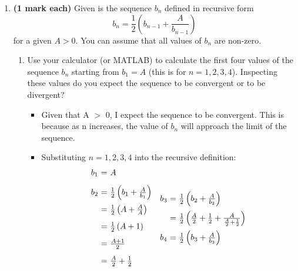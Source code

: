 \documentclass[12pt]{report}
\begin{document}
\begin{enumerate}[leftmargin=\labelsep]
    \item {\bf (1 mark each)} Given is the sequence $b_n$ defined in recursive form
        \begin{equation*}
            b_n=\frac{1}{2}\left(b_{n-1}+\frac{A}{b_{n-1}} \right)
        \end{equation*} for a given $A>0$. You can assume that all values of $b_n$ are non-zero.
        \begin{enumerate}
            \item Use your calculator (or MATLAB) to calculate the first four values of the sequence $b_n$ starting from $b_1=A$ (this is for $n=1,2,3,4$). Inspecting these values do you expect the sequence to be convergent or to be divergent?
                \begin{tcolorbox}
                    \begin{itemize}[label={}]
                        \item Given that A $>$ 0, I expect the sequence to be convergent. This is because as n increases, the value of $b_n$ will approach the limit of the sequence.
                        \item Substituting $n=1,2,3,4$ into the recursive definition:
                        \begin{equation*}
                            \begin{array}{r@{~=~}l}
                                b_{1} & A \\ [2ex]
                                b_{2} & \frac{1}{2}\left(b_{1}+\frac{A}{b_{1}} \right) \\ [2ex]
                                & \frac{1}{2}\left(A+\frac{A}{A} \right) \\ [2ex]
                                & \frac{1}{2}\left(A+1 \right) \\ [2ex]
                                & \frac{A+1}{2} \\ [2ex]
                                & \frac{A}{2}+\frac{1}{2} \\ [2ex]
                            \end{array}
                            \begin{array}{r@{~=~}l}
                                b_{3} & \frac{1}{2}\left(b_{2}+\frac{A}{b_{2}} \right) \\ [2ex]
                                & \frac{1}{2}\left(\frac{A}{2}+\frac{1}{2}+\frac{A}{\frac{A}{2}+\frac{1}{2}} \right) \\ [2ex]
                                b_{4} & \frac{1}{2}\left(b_{3}+\frac{A}{b_{3}} \right) \\ [2ex]

\end{array}
\end{equation*}
\end{itemize}
\end{tcolorbox}
\end{enumerate}
\end{enumerate}
\end{document}

